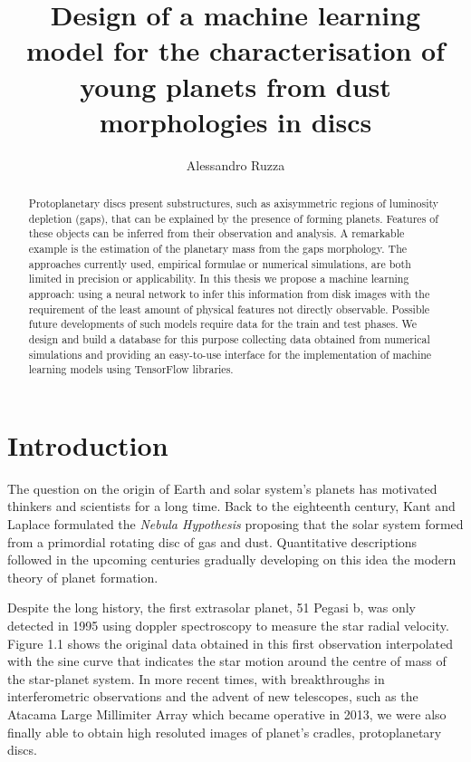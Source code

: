 \documentclass[a4paper,10pt]{report}
\title{Design of a machine learning model for the characterisation of young planets from dust morphologies in discs}
\author{Alessandro Ruzza}
\begin{document}


\begin{abstract}
    Protoplanetary discs present substructures,
    such as axisymmetric regions of luminosity depletion (gaps),
    that can be explained by the presence of forming planets. 
    Features of these objects can be inferred from their
    observation and analysis. A remarkable example is the 
    estimation of the planetary mass from the gaps morphology.
    The approaches currently used, empirical formulae or numerical
    simulations, are both limited in precision or applicability.
    In this thesis we propose a machine learning approach:
    using a neural network to infer this information from 
    disk images with the requirement of the least amount
    of physical features not directly observable.
    Possible future developments of such models require 
    data for the train and test phases.
    We design and build a database for this purpose collecting 
    data obtained from numerical simulations and providing an 
    easy-to-use interface for the implementation of machine learning
    models using TensorFlow libraries.
\end{abstract}

\tableofcontents

\chapter{Introduction}

The question on the origin of Earth and solar system's planets has motivated 
thinkers and scientists for a long time.
Back to the eighteenth century, Kant and Laplace formulated the
\emph{Nebula Hypothesis} proposing that the solar system
formed from a primordial rotating disc of gas and dust. Quantitative descriptions followed in the upcoming centuries 
gradually developing on this idea the modern theory of planet formation.

Despite the long history, the first extrasolar planet, 51 Pegasi b, was only detected in 1995 using doppler spectroscopy to
measure the star radial velocity. Figure 1.1 shows the original data obtained in this first observation \citep{Mayor1995}
interpolated with the sine curve that indicates the star motion around the centre of mass of the star-planet system.
In more recent times, with breakthroughs in interferometric observations 
and the advent of new telescopes, such as the Atacama Large Millimiter Array which became operative in 2013, we were also
finally able to obtain high resoluted images of planet's
cradles, protoplanetary discs.
\end{document}

